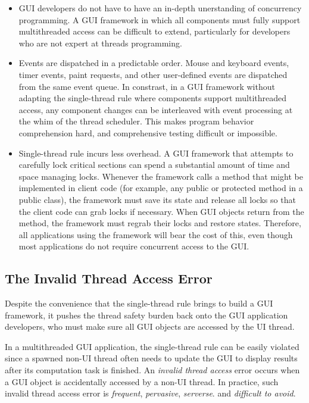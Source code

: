 \begin{itemize}

\item GUI developers do not have to have an in-depth
unerstanding of concurrency programming. A GUI framework in which all components
must fully support multithreaded access can be difficult to extend, particularly
for developers who are not expert at threads programming.

\item Events are dispatched in a predictable order. Mouse and keyboard events, timer events, 
paint requests, and other user-defined events are dispatched from the same event queue.
In constrast, in a GUI framework without adapting the single-thread rule where components
support multithreaded access, any component changes can be interleaved with event
processing at the whim of the thread scheduler. This makes program behavior comprehension hard,
 and comprehensive testing difficult or impossible. 

\item Single-thread rule incurs less overhead.
A GUI framework that attempts to carefully lock critical sections can spend a substantial
amount of time and space managing locks. Whenever the framework calls a method that might
be implemented in client code (for example, any public or protected method in a public class),
the framework must save its state and release all locks so that the client code can grab locks
if necessary. When GUI objects return from the method, the framework must regrab their locks and
restore states. Therefore, all applications using the framework will bear the cost of this, even though most
applications do not require concurrent access to the GUI.

\end{itemize}


\subsection{The Invalid Thread Access Error}

Despite the convenience that the single-thread rule brings to build a
GUI framework, it pushes the thread safety burden back onto the GUI application developers,
who must make sure all GUI objects are accessed by the UI thread.

In a multithreaded GUI application, the single-thread rule can be
easily violated since a spawned non-UI thread often needs to update
the GUI to display results after its computation task is finished.
An \textit{invalid thread access} error occurs when
a GUI object is accidentally accessed by a non-UI thread. In practice, such
invalid thread access error is \textit{frequent}, \textit{pervasive}, \textit{serverse}.
and \textit{difficult to avoid}.

